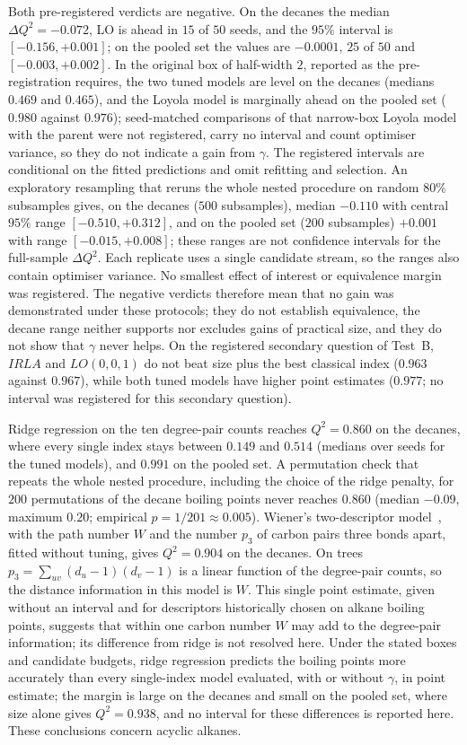 Both pre-registered verdicts are negative. On the decanes the median
$\Delta Q^2 = -0.072$, LO is ahead in $15$ of $50$ seeds, and the $95\%$
interval is $[-0.156, +0.001]$; on the pooled set the values are
$-0.0001$, $25$ of $50$ and $[-0.003, +0.002]$. In the original box of
half-width $2$, reported as the pre-registration requires, the two tuned
models are level on the decanes (medians $0.469$ and $0.465$), and the
Loyola model is marginally ahead on the pooled set ($0.980$ against
$0.976$); seed-matched comparisons of that narrow-box Loyola model with the
parent were not registered, carry no interval and count optimiser
variance, so they do not indicate a gain from $\gamma$. The registered
intervals are conditional on the fitted predictions and omit refitting and
selection. An exploratory resampling that reruns the whole nested procedure
on random $80\%$ subsamples gives, on the decanes ($500$ subsamples),
median $-0.110$ with central $95\%$ range $[-0.510, +0.312]$, and on the
pooled set ($200$ subsamples) $+0.001$ with range $[-0.015, +0.008]$;
these ranges are not confidence intervals for the full-sample
$\Delta Q^2$. Each replicate uses a single candidate stream, so the ranges
also contain optimiser variance. No smallest effect of interest or equivalence margin was
registered. The negative verdicts therefore mean that no gain was
demonstrated under these protocols; they do not establish equivalence, the
decane range neither supports nor excludes gains of practical size, and
they do not show that $\gamma$ never helps. On the registered secondary
question of Test~B, $IRLA$ and $LO(0,0,1)$ do not beat size plus the best
classical index ($0.963$ against $0.967$), while both tuned models have
higher point estimates ($0.977$; no interval was registered for this
secondary question).

Ridge regression on the ten degree-pair counts reaches $Q^2 = 0.860$ on
the decanes, where every single index stays between $0.149$ and $0.514$
(medians over seeds for the tuned models),
and $0.991$ on the pooled set. A permutation check that repeats the whole nested
procedure, including the choice of the ridge penalty, for $200$
permutations of the decane boiling points never reaches $0.860$ (median
$-0.09$, maximum $0.20$; empirical $p = 1/201 \approx 0.005$). Wiener's
two-descriptor model~\cite{Wiener1947}, with the path number $W$ and the
number $p_3$ of carbon pairs three bonds apart, fitted without tuning,
gives $Q^2 = 0.904$ on the decanes. On trees
$p_3 = \sum_{uv}(d_u - 1)(d_v - 1)$ is a linear function of the degree-pair
counts, so the distance information in this model is $W$. This single
point estimate, given without an interval and for descriptors historically
chosen on alkane boiling points, suggests that within one carbon number
$W$ may add to the degree-pair information; its difference from ridge is
not resolved here.
Under the stated boxes and candidate budgets, ridge regression predicts
the boiling points more accurately than every single-index model
evaluated, with or without $\gamma$, in point estimate; the margin is
large on the decanes and small on the pooled set, where size alone gives
$Q^2 = 0.938$, and no interval for these differences is reported here. These conclusions concern acyclic
alkanes.

